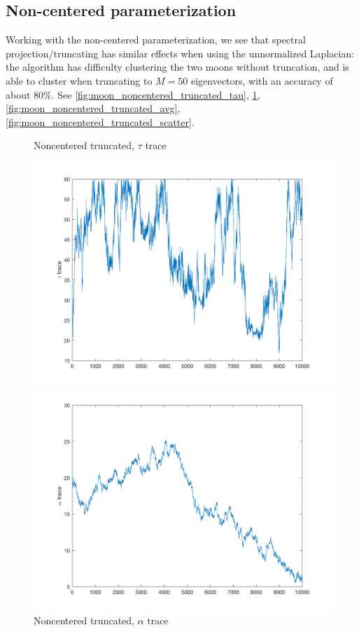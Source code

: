 \documentclass{siamart1116}
\begin{document}
\subsection{Non-centered parameterization}
Working with the non-centered parameterization, we see that spectral projection/truncating has similar effects when using the unnormalized Laplacian: the algorithm has difficulty clustering the two moons without truncation, and is able to cluster when truncating to $M=50$ eigenvectors, with an accuracy of about $80\%$. See \cref{fig:moon_noncentered_truncated_tau}, \cref{fig:moon_noncentered_truncated_alpha}, \cref{fig:moon_noncentered_truncated_avg}, \cref{fig:moon_noncentered_truncated_scatter}.

\begin{figure}[!htb]
    \begin{minipage}{0.48\textwidth}
        \centering
        \caption{\label{fig:moon_noncentered_truncated_tau} Noncentered truncated, $\tau$ trace}
        \includegraphics[width=\linewidth]{graphics/moons/noncentered_un_truncated/trace_tau.png}
    \end{minipage} \hfill
    \begin{minipage}{0.48\textwidth}
        \centering
        \caption{\label{fig:moon_noncentered_truncated_alpha} Noncentered truncated, $\alpha$ trace}
        \includegraphics[width=\linewidth]{graphics/moons/noncentered_un_truncated/trace_alpha.png}

\end{minipage}
\end{figure}
\end{document}
